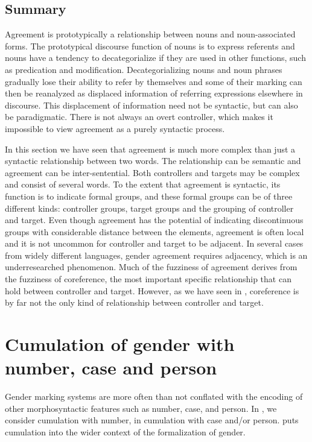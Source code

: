 \documentclass[output=collectionpaper]{langsci/langscibook}
\begin{document}
  \subsection{Summary}

Agreement is prototypically a relationship between nouns and noun-associated forms. The prototypical discourse function of nouns is to express referents and nouns have a tendency to decategorialize if they are used in other functions, such as predication and modification. Decategorializing nouns and noun phrases gradually lose their ability to refer by themselves and some of their marking can then be reanalyzed as displaced information of referring expressions elsewhere in discourse. This displacement of information need not be syntactic, but can also be paradigmatic. There is not always an overt controller, which makes it impossible to view agreement as a purely syntactic process.

In this section we have seen that agreement is much more complex than just a syntactic relationship between two words. The relationship can be semantic and agreement can be inter-sentential. Both controllers and targets may be complex and consist of several words. To the extent that agreement is syntactic, its function is to indicate formal groups, and these formal groups can be of three different kinds: controller groups, target groups and the grouping of controller and target. Even though agreement has the potential of indicating discontinuous groups with considerable distance between the elements, agreement is often local and it is not uncommon for controller and target to be adjacent. In several cases from widely different languages, gender agreement requires adjacency, which is an underresearched phenomenon. Much of the fuzziness of agreement derives from the fuzziness of coreference, the most important specific relationship that can hold between controller and target. However, as we have seen in , coreference is by far not the only kind of relationship between controller and target.


\section{Cumulation of gender with number, case and person}
\label{sec:WDG:8}

Gender marking systems are more often than not conflated with the encoding of other morphosyntactic features such as number, case, and person. In , we consider cumulation with number, in  cumulation with case and/or person.  puts cumulation into the wider context of the formalization of gender.
\end{document}
